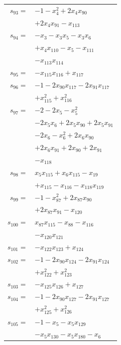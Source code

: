 \begin{longtable}{@{}r@{\;}l@{}}
\(s_{93}=\) & \(\displaystyle -1 -x_{4}^{2} +2x_{4}x_{90}\) \\
 & \(\displaystyle +2x_{4}x_{91} -x_{113}\) \\[3pt]
\(s_{94}=\) & \(\displaystyle -x_{3} -x_{3}x_{5} -x_{3}x_{6}\) \\
 & \(\displaystyle +x_{4}x_{110} -x_{5} -x_{111}\) \\
 & \(\displaystyle -x_{113}x_{114}\) \\[3pt]
\(s_{95}=\) & \(\displaystyle -x_{115}x_{116} +x_{117}\) \\[3pt]
\(s_{96}=\) & \(\displaystyle -1 -2x_{90}x_{117} -2x_{91}x_{117}\) \\
 & \(\displaystyle +x_{115}^{2} +x_{116}^{2}\) \\[3pt]
\(s_{97}=\) & \(\displaystyle -2 -2x_{5} -x_{5}^{2}\) \\
 & \(\displaystyle -2x_{5}x_{6} +2x_{5}x_{90} +2x_{5}x_{91}\) \\
 & \(\displaystyle -2x_{6} -x_{6}^{2} +2x_{6}x_{90}\) \\
 & \(\displaystyle +2x_{6}x_{91} +2x_{90} +2x_{91}\) \\
 & \(\displaystyle -x_{118}\) \\[3pt]
\(s_{98}=\) & \(\displaystyle x_{5}x_{115} +x_{6}x_{115} -x_{19}\) \\
 & \(\displaystyle +x_{115} -x_{116} -x_{118}x_{119}\) \\[3pt]
\(s_{99}=\) & \(\displaystyle -1 -x_{87}^{2} +2x_{87}x_{90}\) \\
 & \(\displaystyle +2x_{87}x_{91} -x_{120}\) \\[3pt]
\(s_{100}=\) & \(\displaystyle x_{87}x_{115} -x_{88} -x_{116}\) \\
 & \(\displaystyle -x_{120}x_{121}\) \\[3pt]
\(s_{101}=\) & \(\displaystyle -x_{122}x_{123} +x_{124}\) \\[3pt]
\(s_{102}=\) & \(\displaystyle -1 -2x_{90}x_{124} -2x_{91}x_{124}\) \\
 & \(\displaystyle +x_{122}^{2} +x_{123}^{2}\) \\[3pt]
\(s_{103}=\) & \(\displaystyle -x_{125}x_{126} +x_{127}\) \\[3pt]
\(s_{104}=\) & \(\displaystyle -1 -2x_{90}x_{127} -2x_{91}x_{127}\) \\
 & \(\displaystyle +x_{125}^{2} +x_{126}^{2}\) \\[3pt]
\(s_{105}=\) & \(\displaystyle -1 -x_{5} -x_{5}x_{129}\) \\
 & \(\displaystyle -x_{5}x_{130} -x_{5}x_{180} -x_{6}\) \\

\end{longtable}
